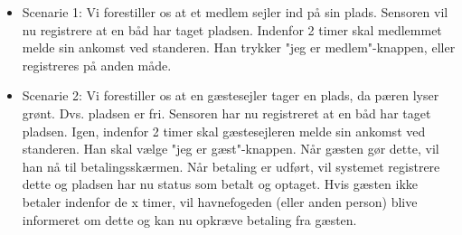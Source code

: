 \begin{itemize}
  \item Scenarie 1: Vi forestiller os at et medlem sejler ind på sin plads. Sensoren vil nu registrere at en båd har taget pladsen. Indenfor 2 timer skal medlemmet melde sin ankomst ved standeren. Han trykker "jeg er medlem"-knappen, eller registreres på anden måde. 
  \item Scenarie 2: Vi forestiller os at en gæstesejler tager en plads, da pæren lyser grønt. Dvs. pladsen er fri. Sensoren har nu registreret at en båd har taget pladsen. Igen, indenfor 2 timer skal gæstesejleren melde sin ankomst ved standeren. Han skal vælge "jeg er gæst"-knappen. Når gæsten gør dette, vil han nå til betalingsskærmen. Når betaling er udført, vil systemet registrere dette og pladsen har nu status som betalt og optaget. Hvis gæsten ikke betaler indenfor de x timer, vil havnefogeden (eller anden person) blive informeret om dette og kan nu opkræve betaling fra gæsten. 
\end{itemize}

